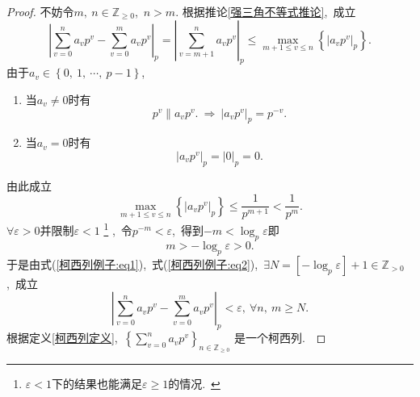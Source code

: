 \documentclass[UTF8, twoside]{ctexart}
\theoremstyle{nonumberplain}
\newtheorem{proof}{\heiti 证明}  %
\theoremstyle{nonumberplain}
\theoremstyle{plain}
\begin{document}
	\begin{proof}
		不妨令$m,\ n\in {{\mathbb{Z}}_{\ge 0}}$,\ $n>m$. 
		根据推论\ref{强三角不等式推论},\ 成立
		\begin{equation} \label{柯西列例子:eq1}
			{{\left| \sum\limits_{v=0}^{n}{{{a}_{v}}{{p}^{v}}}-\sum\limits_{v=0}^{m}{{{a}_{v}}{{p}^{v}}} \right|}_{p}}={{\left| \sum\limits_{v=m+1}^{n}{{{a}_{v}}{{p}^{v}}} \right|}_{p}}\le 
			\max_{m+1\le v\le n}\left\{ {{\left| {{a}_{v}}{{p}^{v}} \right|}_{p}} \right\}.
		\end{equation}
		由于${{a}_{v}}\in \left\{ 0,\ 1,\ \cdots,\ p-1 \right\}$,\ 
		\begin{enumerate}
			\item 当${{a}_{v}}\ne 0$时有
			\[
				\left. {{p}^{v}} \right\|{{a}_{v}}{{p}^{v}}.\ \Longrightarrow\ {{\left| {{a}_{v}}{{p}^{v}} \right|}_{p}}={{p}^{-v}}.
			\]
			
			\item 当${{a}_{v}}=0$时有
			\[
				{{\left| {{a}_{v}}{{p}^{v}} \right|}_{p}}={{\left| 0 \right|}_{p}}=0.	
			\]
		\end{enumerate}
		由此成立
		\begin{equation} \label{柯西列例子:eq2}
			\max_{m+1\le v\le n}\left\{ {{\left| {{a}_{v}}{{p}^{v}} \right|}_{p}} \right\}\le \frac{1}{{{p}^{m+1}}}<\frac{1}{{{p}^{m}}}.
		\end{equation}
		$\forall \varepsilon >0$并限制$\varepsilon <1$
		\footnote{$\varepsilon <1$下的结果也能满足$\varepsilon \ge 1$的情况.\ }
		,\ 令${{p}^{-m}}<\varepsilon $,\ 得到$-m<{{\log }_{p}}\varepsilon $即
		\[
			m>-{{\log }_{p}}\varepsilon >0.
		\]
		于是由式(\ref{柯西列例子:eq1}),\ 式(\ref{柯西列例子:eq2}),\ 
		$\exists N=\left[ -{{\log }_{p}}\varepsilon  \right]+1\in {{\mathbb{Z}}_{>0}}$,\ 成立
		\[
			{{\left| \sum\limits_{v=0}^{n}{{{a}_{v}}{{p}^{v}}}-\sum\limits_{v=0}^{m}{{{a}_{v}}{{p}^{v}}} \right|}_{p}}<\varepsilon ,\ \forall n,\ m\ge N.
		\]
		根据定义\ref{柯西列定义},\ 
		$
			{{\left\{ \sum_{v=0}^{n}{{{a}_{v}}{{p}^{v}}} \right\}}_{n\in {{\mathbb{Z}}_{\ge 0}}}}
		$
		是一个柯西列.\ 
	\end{proof}
	\vskip 0.5cm
	
\end{document}
